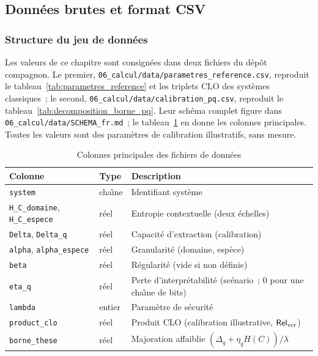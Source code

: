 \subsection{Donn\'ees brutes et format CSV}
\label{sec:donnees_brutes}
\begin{sloppypar}

\subsubsection{Structure du jeu de donn\'ees}
\label{subsec:structure_csv}

Les valeurs de ce chapitre sont consign\'ees dans deux fichiers du d\'ep\^ot
compagnon. Le premier, \texttt{06\_calcul/data/parametres\_reference.csv}, reproduit le
tableau~\ref{tab:parametres_reference} et les triplets CLO des syst\`emes
classiques~; le second, \texttt{06\_calcul/data/calibration\_pq.csv}, reproduit le
tableau~\ref{tab:decomposition_borne_pq}. Leur sch\'ema complet figure dans
\texttt{06\_calcul/data/SCHEMA\_fr.md}~; le tableau~\ref{tab:structure_csv} en donne les
colonnes principales. Toutes les valeurs sont des param\`etres de calibration
illustratifs, sans mesure.

\begin{table}[htbp]
\centering
\caption{Colonnes principales des fichiers de donn\'ees}
\label{tab:structure_csv}
\begin{tabular}{@{}lll@{}}
\toprule
\textbf{Colonne} & \textbf{Type} & \textbf{Description} \\
\midrule
\texttt{system} & cha\^{\i}ne & Identifiant syst\`eme \\
\texttt{H\_C\_domaine}, \texttt{H\_C\_espece} & r\'eel & Entropie contextuelle (deux \'echelles) \\
\texttt{Delta}, \texttt{Delta\_q} & r\'eel & Capacit\'e d'extraction (calibration) \\
\texttt{alpha}, \texttt{alpha\_espece} & r\'eel & Granularit\'e (domaine, esp\`ece) \\
\texttt{beta} & r\'eel & R\'egularit\'e (vide si non d\'efinie) \\
\texttt{eta\_q} & r\'eel & Perte d'interpr\'etabilit\'e (sc\'enario~; $0$ pour une cha\^{\i}ne de bits) \\
\texttt{lambda} & entier & Param\`etre de s\'ecurit\'e \\
\texttt{product\_clo} & r\'eel & Produit CLO (calibration illustrative, $\mathsf{Rel}_{\mathrm{ver}}$) \\
\texttt{borne\_these} & r\'eel & Majoration affaiblie $(\Delta_q + \eta_q H(C))/\lambda$ \\
\bottomrule
\end{tabular}
\end{table}


\end{sloppypar}
